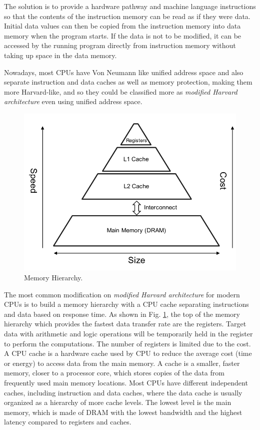 The solution is to provide a hardware pathway and machine language instructions so that the contents of the instruction memory can be read as if they were data. Initial data values can then be copied from the instruction memory into data memory when the program starts. If the data is not to be modified, it can be accessed by the running program directly from instruction memory without taking up space in the data memory.

Nowadays, most CPUs have Von Neumann like unified address space and also separate instruction and data caches as well as memory protection, making them more Harvard-like, and so they could be classified more as \textit{modified Harvard architecture} even using unified address space.

\begin{figure}[htbp]
	\centering
	\includegraphics[width=0.81\linewidth]{fig/memory.pdf}
	\caption{Memory Hierarchy.}
	\label{fig:memory-access}
\end{figure}

The most common modification on \textit{modified Harvard architecture}  for modern CPUs is to build a memory hierarchy with a CPU cache separating instructions and data based on response time. As shown in Fig. \ref{fig:memory-access}, the top of the memory hierarchy which provides the fastest data transfer rate are the registers. Target data with arithmetic and logic operations will be temporarily held in the register to perform the computations. The number of registers is limited due to the cost. A CPU cache is a hardware cache used by CPU to reduce the average cost (time or energy) to access data from the main memory. A cache is a smaller, faster memory, closer to a processor core, which stores copies of the data from frequently used main memory locations. Most CPUs have different independent caches, including instruction and data caches, where the data cache is usually organized as a hierarchy of more cache levels. The lowest level is the main memory, which is made of DRAM with the lowest bandwidth and the highest latency compared to registers and caches.

